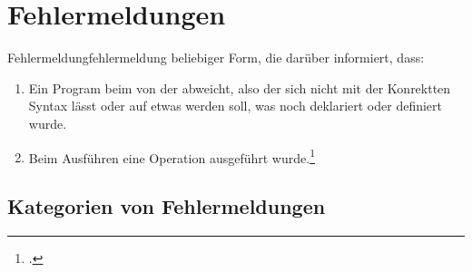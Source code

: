 \section{Fehlermeldungen}
\begin{Definition}{Fehlermeldung}{fehlermeldung}
   beliebiger Form, die darüber informiert, dass:
  \begin{enumerate}
    \item Ein Program beim  von der  abweicht, also der  sich nicht mit der Konrektten Syntax  lässt oder auf etwas  werden soll, was noch  deklariert oder definiert wurde.
    \item Beim Ausführen eine  Operation ausgeführt wurde.\footcite{noauthor_errors_nodate}
  \end{enumerate}
\end{Definition}

\subsection{Kategorien von Fehlermeldungen}
